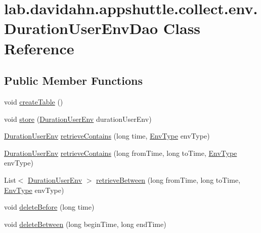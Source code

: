 \hypertarget{classlab_1_1davidahn_1_1appshuttle_1_1collect_1_1env_1_1_duration_user_env_dao}{\section{lab.\-davidahn.\-appshuttle.\-collect.\-env.\-Duration\-User\-Env\-Dao \-Class \-Reference}
\label{classlab_1_1davidahn_1_1appshuttle_1_1collect_1_1env_1_1_duration_user_env_dao}
}
\subsection*{\-Public \-Member \-Functions}
\begin{DoxyCompactItemize}
\item 
void \hyperlink{classlab_1_1davidahn_1_1appshuttle_1_1collect_1_1env_1_1_duration_user_env_dao_a765a4ad7e4c1fc3aa90a592ecfa552e6}{create\-Table} ()
\item 
void \hyperlink{classlab_1_1davidahn_1_1appshuttle_1_1collect_1_1env_1_1_duration_user_env_dao_a49289193d0ff02eda4abba945300a5ea}{store} (\hyperlink{classlab_1_1davidahn_1_1appshuttle_1_1collect_1_1env_1_1_duration_user_env}{\-Duration\-User\-Env} duration\-User\-Env)
\item 
\hyperlink{classlab_1_1davidahn_1_1appshuttle_1_1collect_1_1env_1_1_duration_user_env}{\-Duration\-User\-Env} \hyperlink{classlab_1_1davidahn_1_1appshuttle_1_1collect_1_1env_1_1_duration_user_env_dao_ad6232fa96a37cfdf5cdd01b8ab1b9e0a}{retrieve\-Contains} (long time, \hyperlink{enumlab_1_1davidahn_1_1appshuttle_1_1collect_1_1env_1_1_env_type}{\-Env\-Type} env\-Type)
\item 
\hyperlink{classlab_1_1davidahn_1_1appshuttle_1_1collect_1_1env_1_1_duration_user_env}{\-Duration\-User\-Env} \hyperlink{classlab_1_1davidahn_1_1appshuttle_1_1collect_1_1env_1_1_duration_user_env_dao_a6be688edf887731335f3a7f3054a8d2b}{retrieve\-Contains} (long from\-Time, long to\-Time, \hyperlink{enumlab_1_1davidahn_1_1appshuttle_1_1collect_1_1env_1_1_env_type}{\-Env\-Type} env\-Type)
\item 
\-List$<$ \hyperlink{classlab_1_1davidahn_1_1appshuttle_1_1collect_1_1env_1_1_duration_user_env}{\-Duration\-User\-Env} $>$ \hyperlink{classlab_1_1davidahn_1_1appshuttle_1_1collect_1_1env_1_1_duration_user_env_dao_aac99ba4d0a65aabc39cd06308687971e}{retrieve\-Between} (long from\-Time, long to\-Time, \hyperlink{enumlab_1_1davidahn_1_1appshuttle_1_1collect_1_1env_1_1_env_type}{\-Env\-Type} env\-Type)
\item 
void \hyperlink{classlab_1_1davidahn_1_1appshuttle_1_1collect_1_1env_1_1_duration_user_env_dao_a97173967493b1d72eade9205323924cc}{delete\-Before} (long time)
\item 
void \hyperlink{classlab_1_1davidahn_1_1appshuttle_1_1collect_1_1env_1_1_duration_user_env_dao_a183e140469ad9a5caabd2d555d3ff47f}{delete\-Between} (long begin\-Time, long end\-Time)
\end{DoxyCompactItemize}
